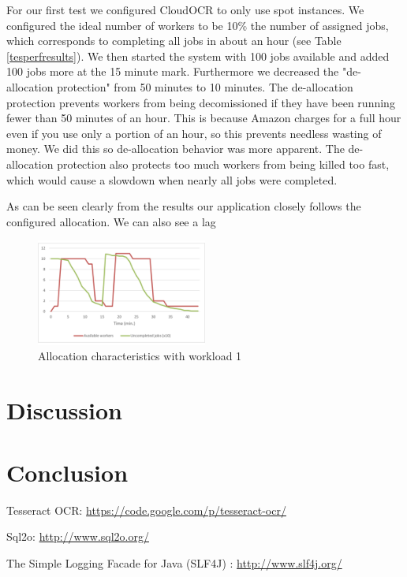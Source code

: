 \documentclass[a4paper]{IEEEtran}
\begin{document}
For our first test we configured CloudOCR to only use spot instances. We configured the ideal number of workers to be 10\% the number of assigned jobs, which corresponds to completing all jobs in about an hour (see Table \ref{tesperfresults}). We then started the system with 100 jobs available and added 100 jobs more at the 15 minute mark.
Furthermore we decreased the "de-allocation protection" from 50 minutes to 10 minutes. The de-allocation protection prevents workers from being decomissioned if they have been running fewer than 50 minutes of an hour. This is because Amazon charges for a full hour even if you use only a portion of an hour, so this prevents needless wasting of money. We did this so de-allocation behavior was more apparent. The de-allocation protection also protects too much workers from being killed too fast, which would cause a slowdown when nearly all jobs were completed.

As can be seen clearly from the results our application closely follows the configured allocation. We can also see a lag 

\begin{figure}
\centering
\includegraphics[width=0.5\textwidth]{"results-allocation-2"}
\caption{Allocation characteristics with workload 1}
\label{fig_tesperfresults}
\end{figure}
 

\section{Discussion}

\section{Conclusion}

\begin{thebibliography}{9}

 

 {
	Tesseract OCR: \url{https://code.google.com/p/tesseract-ocr/}
}

 {
	Sql2o: \url{http://www.sql2o.org/}
}

 {
	The Simple Logging Facade for Java (SLF4J) : \url{http://www.slf4j.org/}
}

\end{thebibliography}
\end{document}

